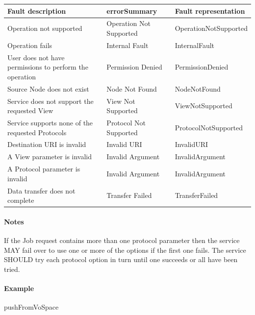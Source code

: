 \documentclass[11pt,a4paper]{ivoa}
\begin{document}
\vspace{3mm}
\begin{tabular}{ p{5cm} l p{4cm} }
\textbf{Fault description} & \textbf{errorSummary} & \textbf{Fault representation} \\
\hline
Operation not supported & Operation Not Supported & OperationNotSupported \\
\hline
Operation fails & Internal Fault & InternalFault \\
\hline
User does not have permissions to perform the operation	 & Permission Denied & PermissionDenied \\
\hline
Source Node does not exist & Node Not Found & NodeNotFound \\
\hline
Service does not support the requested View & View Not Supported & ViewNotSupported \\
\hline
Service supports none of the requested Protocols & Protocol Not Supported &ProtocolNotSupported \\
\hline
Destination URI is invalid & Invalid URI & InvalidURI \\
\hline
A View parameter is invalid & Invalid Argument & InvalidArgument \\
\hline
A Protocol parameter is invalid & Invalid Argument & InvalidArgument \\
\hline
Data transfer does not complete & Transfer Failed & TransferFailed \\
\hline
\end{tabular}
\vspace{3mm}

\paragraph{Notes}
If the Job request contains more than one protocol parameter then the service MAY fail over to use one or more of the options if the first one fails. The service SHOULD try each protocol option in turn until one succeeds or all have been tried.

\paragraph{Example}
pushFromVoSpace
\end{document}
